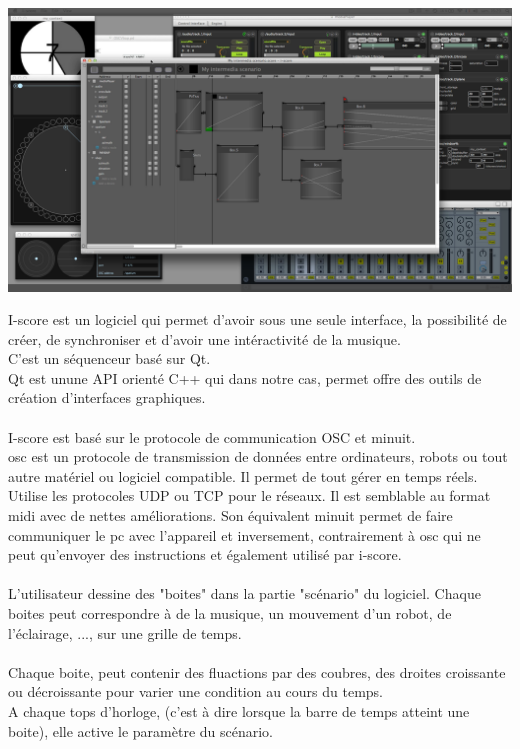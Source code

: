 \documentclass[10pt,a4paper]{report}
\begin{document}
\begin{center}
\includegraphics[scale=0.1]{image/iscore.jpg}
\end{center}

I-score est un logiciel qui permet d'avoir sous une seule interface, la possibilité de créer, de synchroniser et d'avoir une intéractivité de la musique.
\\
C'est un séquenceur basé sur Qt.\\
Qt est unune API orienté C++ qui dans notre cas, permet offre des outils de création d'interfaces graphiques.
\paragraph{}
I-score est basé sur le protocole de communication OSC et minuit.
\\
\acrfull{osc} est un protocole de transmission de données entre ordinateurs, robots ou tout autre matériel ou logiciel compatible. Il permet de tout gérer en temps réels. Utilise les protocoles UDP ou TCP pour le réseaux. Il est semblable au format \acrfull{midi} avec de nettes améliorations. Son équivalent minuit permet de faire communiquer le pc avec l'appareil et inversement, contrairement à \acrshort{osc} qui ne peut qu'envoyer des instructions et également utilisé par i-score.
\paragraph{}
L'utilisateur dessine des "boites" dans la partie "scénario" du logiciel. Chaque boites peut correspondre à de la musique, un mouvement d'un robot, de l'éclairage, ..., sur une grille de temps.
\paragraph{}
Chaque boite, peut contenir des fluactions par des coubres, des droites croissante ou décroissante pour varier une condition au cours du temps.
\\
A chaque tops d'horloge, (c'est à dire lorsque la barre de temps atteint une boite), elle active le paramètre du scénario.
\end{document}
